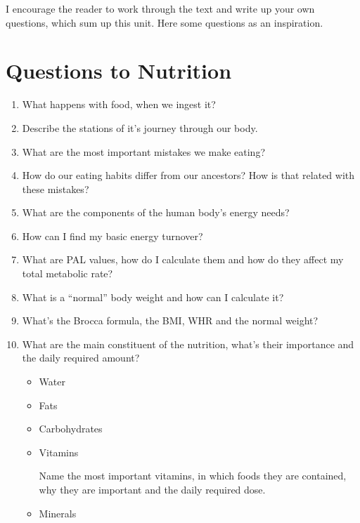 \documentclass[../main.tex]{subfiles}
\begin{document}
I encourage the reader to work through the text and write up your own questions, which sum up this unit.
Here some questions as an inspiration.

\section{Questions to Nutrition}

\begin{enumerate}
\item What happens with food, when we ingest it?
\item Describe the stations of it's journey through our body.
\item What are the most important mistakes we make eating?
\item How do our eating habits differ from our ancestors? How is that related with these mistakes?
\item What are the components of the human body's energy needs?
\item How can I find my basic energy turnover?
\item What are PAL values, how do I calculate them and how do they affect my total metabolic rate?
\item What is a ``normal'' body weight and how can I calculate it?
\item What's the Brocca formula, the BMI, WHR and the normal weight?
\item What are the main constituent of the nutrition, what's their importance and the daily required amount?
  \begin{itemize}
  \item Water
  \item Fats
  \item Carbohydrates
  \item Vitamins

    Name the most important vitamins, in which foods they are contained, why they are important and the daily required dose.

  \item Minerals


\end{itemize}
\end{enumerate}
\end{document}

